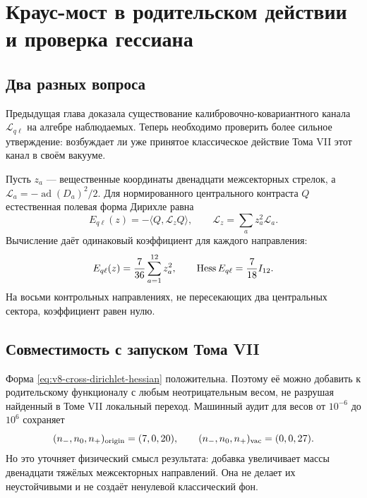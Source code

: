 \chapter{Краус-мост в родительском действии и проверка гессиана}
\label{ch:v8-kraus-bridge-parent-action-hessian-gate}

\section{Два разных вопроса}

Предыдущая глава доказала существование калибровочно-ковариантного канала
$\mathcal L_{q\ell}$ на алгебре наблюдаемых. Теперь необходимо проверить
более сильное утверждение: возбуждает ли уже принятое классическое действие
Тома VII этот канал в своём вакууме.

Пусть $z_a$ --- вещественные координаты двенадцати межсекторных стрелок, а
$\mathcal L_a=-\operatorname{ad}(D_a)^2/2$. Для нормированного центрального
контраста $Q$ естественная полевая форма Дирихле равна
\begin{equation}
 E_{q\ell}(z)
 =-\langle Q,\mathcal L_zQ\rangle,
 \qquad
 \mathcal L_z=\sum_a z_a^2\mathcal L_a.
 \label{eq:v8-field-dependent-kraus-dirichlet}
\end{equation}
Вычисление даёт одинаковый коэффициент для каждого направления:
\begin{equation}
 E_{q\ell}(z)=\frac7{36}\sum_{a=1}^{12}z_a^2,
 \qquad
 \operatorname{Hess} E_{q\ell}=\frac7{18}I_{12}.
 \label{eq:v8-cross-dirichlet-hessian}
\end{equation}
На восьми контрольных направлениях, не пересекающих два центральных
сектора, коэффициент равен нулю.

\section{Совместимость с запуском Тома VII}

Форма \eqref{eq:v8-cross-dirichlet-hessian} положительна. Поэтому её можно
добавить к родительскому функционалу с любым неотрицательным весом, не
разрушая найденный в Томе VII локальный переход. Машинный аудит для весов
от $10^{-6}$ до $10^6$ сохраняет
\begin{equation}
 (n_-,n_0,n_+)_{\rm origin}=(7,0,20),
 \qquad
 (n_-,n_0,n_+)_{\rm vac}=(0,0,27).
\end{equation}
Но это уточняет физический смысл результата: добавка увеличивает массы
двенадцати тяжёлых межсекторных направлений. Она не делает их
неустойчивыми и не создаёт ненулевой классический фон.


